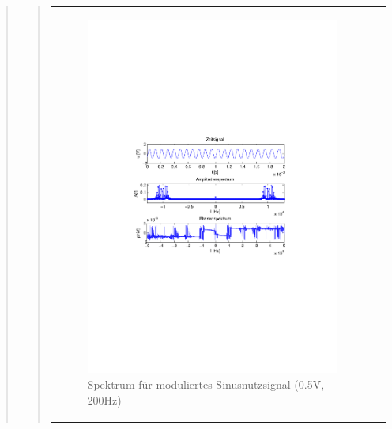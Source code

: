 \begin{quote}
\begin{quote}
            
                   \begin{center}
            \begin{tabular}{ll}

            \hspace{-10em}
                \begin{minipage}{0.6\textwidth}

                    \begin{figure}[H]
                        \label{fig:}
                        \includegraphics[scale=0.5, trim = 4cm 9.5cm 3.5cm
                        9.5cm, clip]{./Bilder/sin_a05_f200}
                        \caption{Spektrum für moduliertes Sinusnutzsignal (0.5V,
                        200Hz)}
                    \end{figure}


\end{minipage}
\end{tabular}
\end{center}
\end{quote}
\end{quote}
